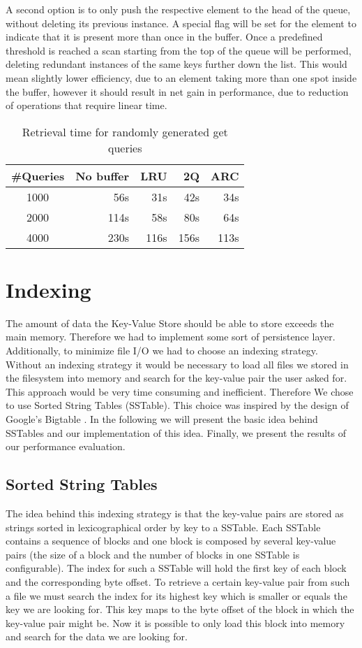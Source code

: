 \documentclass[a4paper, twocolumn,11pt]{article}
\begin{document}
A second option is to only push the respective element to the head of the queue, without deleting its previous instance. A special flag will be set for the element to indicate that it is present more than once in the buffer. Once a predefined threshold is reached a scan starting from the top of the queue will be performed, deleting redundant instances of the same keys further down the list. This would mean slightly lower efficiency, due to an element taking more than one spot inside the buffer, however it should result in net gain in performance, due to reduction of operations that require linear time. 

\begin{table}[h]
\centering
\begin{tabular}{c r r r r}
\hline
\textbf{\#Queries} & \textbf{No buffer} & \textbf{LRU} & \textbf{2Q} & \textbf{ARC}\\
\hline
1000 & 56s & 31s & 42s & 34s\\
2000 & 114s & 58s & 80s & 64s\\
4000 & 230s & 116s & 156s & 113s\\

\hline
\end{tabular}
\caption{Retrieval time for randomly generated get queries}
\end{table}

\section{Indexing}
The amount of data the Key-Value Store should be able to store exceeds the main memory. Therefore we had to implement some sort of persistence layer. Additionally, to minimize file I/O we had to choose an indexing strategy. Without an indexing strategy it would be necessary to load all files we stored in the filesystem into memory and search for the key-value pair the user asked for. This approach would be very time consuming and inefficient. Therefore We chose to use Sorted String Tables (SSTable). This choice was inspired by the design of Google's Bigtable \citep{Chang}. In the following we will present the basic idea behind SSTables and our implementation of this idea. Finally, we present the results of our performance evaluation.

\subsection{Sorted String Tables}
The idea behind this indexing strategy is that the key-value pairs are stored as strings sorted in lexicographical order by key to a SSTable. Each SSTable contains a sequence of blocks and one block is composed by several key-value pairs (the size of a block and the number of blocks in one SSTable is configurable). The index for such a SSTable will hold the first key of each block and the corresponding byte offset. To retrieve a certain key-value pair from such a file we must search the index for its highest key which is smaller or equals the key we are looking for. This key maps to the byte offset of the block in which the key-value pair might be. Now it is possible to only load this block into memory and search for the data we are looking for.
\end{document}
